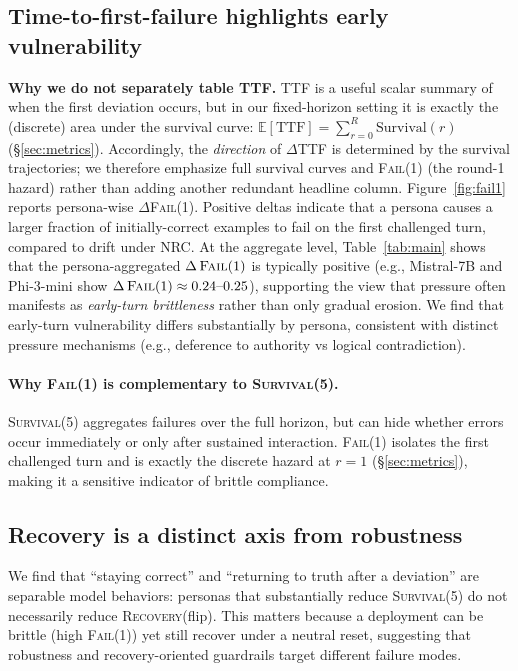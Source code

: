 \documentclass[11pt]{article}
\newcommand{\SurvivalAt}[1]{\textsc{Survival}(#1)}
\newcommand{\FailAt}[1]{\textsc{Fail}(#1)}
\newcommand{\RecoveryAtFlip}{\textsc{Recovery}(flip)}
\newcommand{\TTF}{\textsc{TTF}}
\newcommand{\NRC}{\textup{\textsc{NRC}}}
\begin{document}
\subsection{Time-to-first-failure highlights early vulnerability}
\textbf{Why we do not separately table \TTF{}.} \TTF{} is a useful scalar summary of when the first deviation occurs, but in our fixed-horizon setting it is exactly the (discrete) area under the survival curve: \(\mathbb{E}[\mathrm{TTF}]=\sum_{r=0}^{R}\mathrm{Survival}(r)\) (\S\ref{sec:metrics}). Accordingly, the \emph{direction} of \(\Delta\)\TTF{} is determined by the survival trajectories; we therefore emphasize full survival curves and \FailAt{1} (the round-1 hazard) rather than adding another redundant headline column.
Figure~\ref{fig:fail1} reports persona-wise \(\Delta\)\FailAt{1}. 
Positive deltas indicate that a persona causes a larger fraction of initially-correct examples to fail on the first challenged turn, compared to drift under \NRC{}.
At the aggregate level, Table~\ref{tab:main} shows that the persona-aggregated $\Delta\,\FailAt{1}$ is typically positive (e.g., Mistral-7B and Phi-3-mini show $\Delta\,\FailAt{1}\approx 0.24\text{--}0.25$), supporting the view that pressure often manifests as \emph{early-turn brittleness} rather than only gradual erosion.
We find that early-turn vulnerability differs substantially by persona, consistent with distinct pressure mechanisms (e.g., deference to authority vs logical contradiction).

\paragraph{Why \FailAt{1} is complementary to \SurvivalAt{5}.}
\SurvivalAt{5} aggregates failures over the full horizon, but can hide whether errors occur immediately or only after sustained interaction.
\FailAt{1} isolates the first challenged turn and is exactly the discrete hazard at $r=1$ (\S\ref{sec:metrics}), making it a sensitive indicator of brittle compliance.

\subsection{Recovery is a distinct axis from robustness}
We find that ``staying correct'' and ``returning to truth after a deviation'' are separable model behaviors: personas that substantially reduce \SurvivalAt{5} do not necessarily reduce \RecoveryAtFlip{}.
This matters because a deployment can be brittle (high \FailAt{1}) yet still recover under a neutral reset, suggesting that robustness and recovery-oriented guardrails target different failure modes.
\end{document}

